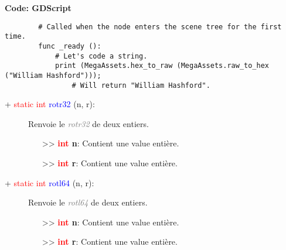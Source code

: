 \documentclass[a4paper, 11pt]{article}
\begin{document}
	\textbf{Code: GDScript}
	\begin{lstlisting}
		# Called when the node enters the scene tree for the first time.
		func _ready ():
			# Let's code a string.
			print (MegaAssets.hex_to_raw (MegaAssets.raw_to_hex ("William Hashford")));
				# Will return "William Hashford".
	\end{lstlisting}
	\begin{description}
		\item [+ \textcolor{red}{static} \textcolor{red}{int} \textcolor{blue}{rotr32} (n, r):] Renvoie le 
		\textit{\textcolor{gray}{rotr32}} de deux entiers.
		\begin{itemize}
			\item [>> \textbf{\textcolor{red}{int} n}:] Contient une value entière.
			\item [>> \textbf{\textcolor{red}{int} r}:] Contient une value entière.\\
		\end{itemize}
	\end{description}
	\begin{description}
		\item [+ \textcolor{red}{static} \textcolor{red}{int} \textcolor{blue}{rotl64} (n, r):] Renvoie le 
		\textit{\textcolor{gray}{rotl64}} de deux entiers.
		\begin{itemize}
			\item [>> \textbf{\textcolor{red}{int} n}:] Contient une value entière.
			\item [>> \textbf{\textcolor{red}{int} r}:] Contient une value entière.\\
		\end{itemize}
	\end{description}
\end{document}
